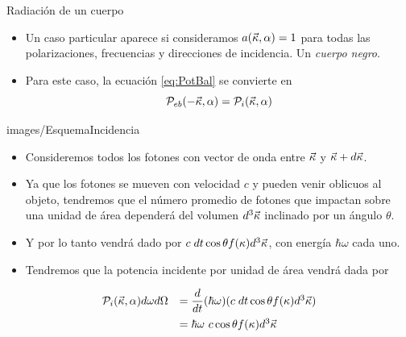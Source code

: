 \documentclass{sintefbeamer}
\begin{document}
\begin{frame}{Radiación de un cuerpo}
    \begin{itemize}
        \item Un caso particular aparece si consideramos $a(\Vec{\kappa},\alpha) = 1$ para todas las polarizaciones, frecuencias y direcciones de incidencia. Un \emph{cuerpo negro}.\pause
        \item Para este caso, la ecuación \ref{eq:PotBal} se convierte en
        \begin{equation}
            \mathcal{P}_{eb}(-\Vec{\kappa},\alpha) = \mathcal{P}_i(\Vec{\kappa},\alpha)
        \end{equation}
    \end{itemize}
\end{frame}

\begin{sidepic}{images/EsquemaIncidencia}{}
    \begin{itemize}
        \item Consideremos todos los fotones con vector de onda entre $\Vec{\kappa}$ y $\Vec{\kappa}+d\Vec{\kappa}$.\pause
        \item Ya que los fotones se mueven con velocidad $c$ y pueden venir oblicuos al objeto, tendremos que el número promedio de fotones que impactan sobre una unidad de área dependerá del volumen $d^3\Vec{\kappa}$ inclinado por un ángulo $\theta$.
        \item Y por lo tanto vendrá dado por $c\hspace{1mm} dt \cos{\theta} f(\kappa) d^3\Vec{\kappa}$, con energía $\hbar\omega$ cada uno.\pause
        \item Tendremos que la potencia incidente por unidad de área vendrá dada por
    \end{itemize}
    \begin{equation}
        \begin{array}{rl}
            \mathcal{P}_i(\Vec{\kappa},\alpha)d\omega d\Omega &= \dfrac{d}{dt}(\hbar\omega) (c\hspace{1mm} dt \cos{\theta} f(\kappa) d^3\Vec{\kappa}) \\[2ex]
            &= \hbar\omega\ c \cos{\theta} f(\kappa) d^3\Vec{\kappa}
        \end{array}
    \end{equation}
\end{sidepic}
\end{document}
